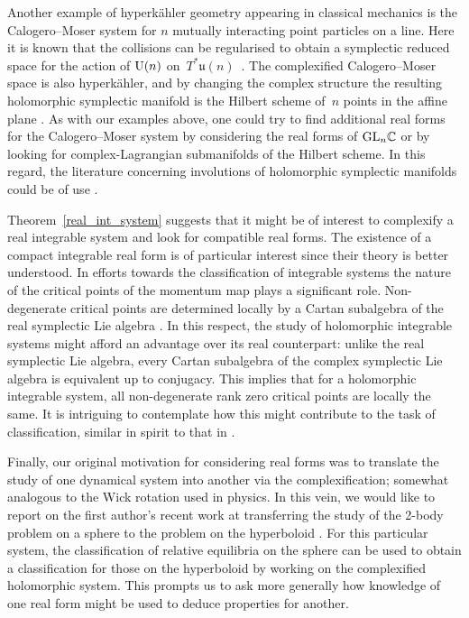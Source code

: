 \documentclass[pdftex]{sigma}
\numberwithin{equation}{section}
\newcommand{\C}{\mathbb{C}}
\begin{document}
Another example of hyperk\"{a}hler geometry appearing in classical mechanics is the Calogero--Moser system for $n$ mutually interacting point particles on a line. Here it is known that the collisions can be regularised to obtain a symplectic reduced space for the action of ${\rm U}(n)$ on~$T^*\mathfrak{u}(n)$~\cite{calogeromoser}. The complexified Calogero--Moser space is also hyperk\"{a}hler, and by changing the complex structure the resulting holomorphic symplectic manifold is the Hilbert scheme of~$n$ points in the affine plane \cite{george}. As with our examples above, one could try to find additional real forms for the Calogero--Moser system by considering the real forms of ${\rm GL}_n\C$ or by looking for complex-Lagrangian submanifolds of the Hilbert scheme. In this regard, the literature concerning involutions of holomorphic symplectic manifolds could be of use \cite{beau,hilbert_involution, brane_involutions}.
	
Theorem~\ref{real_int_system} suggests that it might be of interest to complexify a real integrable system and look for compatible real forms. The existence of a compact integrable real form is of particular interest since their theory is better understood. In efforts towards the classification of integrable systems the nature of the critical points of the momentum map plays a significant role. Non-degenerate critical points are determined locally by a Cartan subalgebra of the real symplectic Lie algebra \cite{int_theory}. In this respect, the study of holomorphic integrable systems might afford an advantage over its real counterpart: unlike the real symplectic Lie algebra, every Cartan subalgebra of the complex symplectic Lie algebra is equivalent up to conjugacy. This implies that for a holomorphic integrable system, all non-degenerate rank zero critical points are locally the same. It is intriguing to contemplate how this might contribute to the task of classification, similar in spirit to that in \cite{anton}.
	
Finally, our original motivation for considering real forms was to translate the study of one dynamical system into another via the complexification; somewhat analogous to the Wick rotation used in physics. In this vein, we would like to report on the first author's recent work at transferring the study of the 2-body problem on a sphere to the problem on the hyperboloid \cite{paper3plus}. For this particular system, the classification of relative equilibria on the sphere can be used to obtain a classification for those on the hyperboloid by working on the complexified holomorphic system. This prompts us to ask more generally how knowledge of one real form might be used to deduce properties for another.
	
\end{document}
